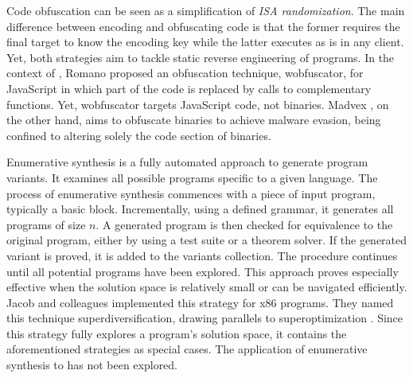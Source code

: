 \begin{strategy}
    \label{obfusscation}
    Code obfuscation can be seen as a simplification of \emph{ISA randomization}. 
    The main difference between encoding and obfuscating code is that the former requires the final target to know the encoding key while the latter executes as is in any client. 
    Yet, both strategies aim to tackle static reverse engineering of programs.
    In the context of \Wasm, Romano \etal \cite{wobfuscator} proposed an obfuscation technique, wobfuscator, for JavaScript in which part of the code is replaced by calls to complementary \Wasm functions.
    Yet, wobfuscator targets JavaScript code, not \Wasm binaries.
    Madvex \cite{madvex}, on the other hand, aims to obfuscate \Wasm binaries to achieve malware evasion, being confined to altering solely the code section of \Wasm binaries. 
\end{strategy}


\begin{strategy}
    \label{enumerative_synthesis}
    Enumerative synthesis is a fully automated approach to generate program variants.
    It examines all possible programs specific to a given language.
    The process of enumerative synthesis commences with a piece of input program, typically a basic block.
    Incrementally, using a defined grammar, it generates all programs of size $n$.
    A generated program is then checked for equivalence to the original program, either by using a test suite or a theorem solver.
    If the generated variant is proved, it is added to the variants collection.
    The procedure continues until all potential programs have been explored.
    This approach proves especially effective when the solution space is relatively small or can be navigated efficiently.
    Jacob and colleagues \cite{jacob2008superdiversifier} implemented this strategy for x86 programs.
    They named this technique superdiversification, drawing parallels to superoptimization \cite{Massalin1987}.
    Since this strategy fully explores a program's solution space, it contains the aforementioned strategies as special cases.
    The application of enumerative synthesis to \Wasm has not been explored. 
\end{strategy}



\label{equivalence:checking}


